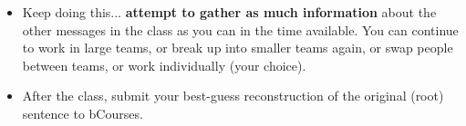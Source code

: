 \documentclass[10pt,letterpaper,english]{article}
\begin{document}
{\begin{itemize}
\item Keep doing this... {\bf attempt to gather as much information} about the other messages in the class as you can in the time available.
You can continue to work in large teams, or break up into smaller teams again, or swap people between teams, or work individually (your choice).
\item After the class, submit your best-guess reconstruction of the original (root) sentence to bCourses.
\end{itemize}
}

\generatepages
\end{document}
